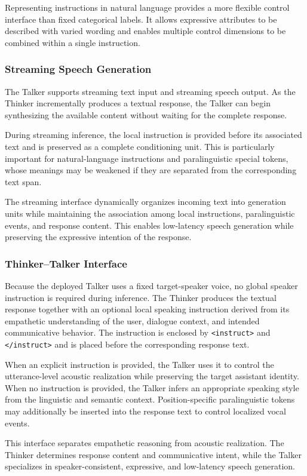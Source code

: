 Representing instructions in natural language provides a more flexible control interface than fixed categorical labels. It allows expressive attributes to be described with varied wording and enables multiple control dimensions to be combined within a single instruction.


\subsubsection{Streaming Speech Generation}

The Talker supports streaming text input and streaming speech output. As the Thinker incrementally produces a textual response, the Talker can begin synthesizing the available content without waiting for the complete response.

During streaming inference, the local instruction is provided before its associated text and is preserved as a complete conditioning unit. This is particularly important for natural-language instructions and paralinguistic special tokens, whose meanings may be weakened if they are separated from the corresponding text span.

The streaming interface dynamically organizes incoming text into generation units while maintaining the association among local instructions, paralinguistic events, and response content. This enables low-latency speech generation while preserving the expressive intention of the response.

\subsubsection{Thinker--Talker Interface}

Because the deployed Talker uses a fixed target-speaker voice, no global
speaker instruction is required during inference. The Thinker produces the
textual response together with an optional local speaking instruction derived
from its empathetic understanding of the user, dialogue context, and intended
communicative behavior. The instruction is enclosed by
\texttt{<instruct>} and \texttt{</instruct>} and is placed before the
corresponding response text.

When an explicit instruction is provided, the Talker uses it to control the
utterance-level acoustic realization while preserving the target assistant
identity. When no instruction is provided, the Talker infers an appropriate
speaking style from the linguistic and semantic context. Position-specific
paralinguistic tokens may additionally be inserted into the response text to
control localized vocal events.

This interface separates empathetic reasoning from acoustic realization. The
Thinker determines response content and communicative intent, while the Talker
specializes in speaker-consistent, expressive, and low-latency speech
generation.